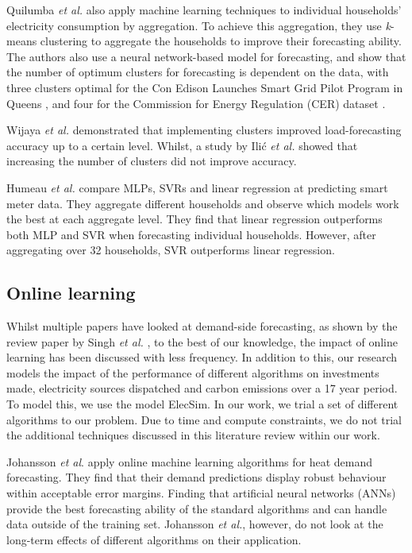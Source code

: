 Quilumba \textit{et al.} \cite{Fard2014} also apply machine learning techniques to individual households' electricity consumption by aggregation. To achieve this aggregation, they use \textit{k}-means clustering to aggregate the households to improve their forecasting ability. The authors also use a neural network-based model for forecasting, and show that the number of optimum clusters for forecasting is dependent on the data, with three clusters optimal for the Con Edison Launches Smart Grid Pilot Program in Queens \cite{queens_dataset}, and four for the Commission for Energy Regulation (CER) dataset \cite{CER_DATASET}.

Wijaya \textit{et al.} \cite{Wijaya2010} demonstrated that implementing clusters improved load-forecasting accuracy up to a certain level. Whilst, a study by Ili\'c \textit{et al.} \cite{Ilic2013} showed that increasing the number of clusters did not improve accuracy.

Humeau \textit{et al.} \cite{Humeau2013} compare MLPs, SVRs and linear regression at predicting smart meter data. They aggregate different households and observe which models work the best at each aggregate level. They find that linear regression outperforms both MLP and SVR when forecasting individual households. However, after aggregating over 32 households, SVR outperforms linear regression.


\subsection{Online learning}

Whilst multiple papers have looked at demand-side forecasting, as shown by the review paper by Singh \textit{et al.} \cite{Singh2012}, to the best of our knowledge, the impact of online learning has been discussed with less frequency. In addition to this, our research models the impact of the performance of different algorithms on investments made, electricity sources dispatched and carbon emissions over a 17 year period. To model this, we use the model ElecSim. In our work, we trial a set of different algorithms to our problem. Due to time and compute constraints, we do not trial the additional techniques discussed in this literature review within our work. 

Johansson \textit{et al}. \cite{Johansson2017} apply online machine learning algorithms for heat demand forecasting. They find that their demand predictions display robust behaviour within acceptable error margins. Finding that artificial neural networks (ANNs) provide the best forecasting ability of the standard algorithms and can handle data outside of the training set. Johansson \textit{et al.}, however, do not look at the long-term effects of different algorithms on their application.

